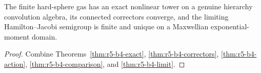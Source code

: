 \begin{theorem}
\label{thm:r5-b4-main}
The finite hard-sphere gas has an exact nonlinear tower on a genuine hierarchy
convolution algebra, its connected correctors converge, and the limiting
Hamilton--Jacobi semigroup is finite and unique on a Maxwellian
exponential-moment domain.
\end{theorem}

\begin{proof}
Combine Theorems~\ref{thm:r5-b4-exact},
\ref{thm:r5-b4-correctors}, \ref{thm:r5-b4-action},
\ref{thm:r5-b4-comparison}, and \ref{thm:r5-b4-limit}.
\end{proof}
